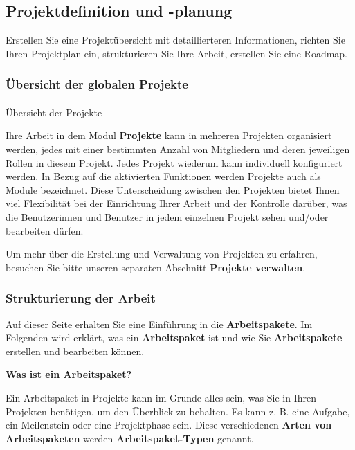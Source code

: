 \documentclass[
  letterpaper,
  DIV=11,
  numbers=noendperiod]{scrreprt}
\makeatletter
\let\oldparagraph\paragraph
\renewcommand{\paragraph}{
    \@ifstar
      \xxxParagraphStar
      \xxxParagraphNoStar
  }
\newcommand{\xxxParagraphStar}[1]{\oldparagraph*{#1}\mbox{}}
\newcommand{\xxxParagraphNoStar}[1]{\oldparagraph{#1}\mbox{}}
\makeatother
\begin{document}
\subsection{Projektdefinition und
-planung}\label{projektdefinition-und--planung}

Erstellen Sie eine Projektübersicht mit detaillierteren Informationen,
richten Sie Ihren Projektplan ein, strukturieren Sie Ihre Arbeit,
erstellen Sie eine Roadmap.

\subsubsection{Übersicht der globalen
Projekte}\label{uxfcbersicht-der-globalen-projekte}

\paragraph{Übersicht der Projekte}\label{uxfcbersicht-der-projekte}

Ihre Arbeit in dem Modul \textbf{Projekte} kann in mehreren Projekten
organisiert werden, jedes mit einer bestimmten Anzahl von Mitgliedern
und deren jeweiligen Rollen in diesem Projekt. Jedes Projekt wiederum
kann individuell konfiguriert werden. In Bezug auf die aktivierten
Funktionen werden Projekte auch als Module bezeichnet. Diese
Unterscheidung zwischen den Projekten bietet Ihnen viel Flexibilität bei
der Einrichtung Ihrer Arbeit und der Kontrolle darüber, was die
Benutzerinnen und Benutzer in jedem einzelnen Projekt sehen und/oder
bearbeiten dürfen.

Um mehr über die Erstellung und Verwaltung von Projekten zu erfahren,
besuchen Sie bitte unseren separaten Abschnitt \textbf{Projekte
verwalten}.

\subsubsection{Strukturierung der
Arbeit}\label{strukturierung-der-arbeit}

Auf dieser Seite erhalten Sie eine Einführung in die
\textbf{Arbeitspakete}. Im Folgenden wird erklärt, was ein
\textbf{Arbeitspaket} ist und wie Sie \textbf{Arbeitspakete} erstellen
und bearbeiten können.

\textbf{Was ist ein Arbeitspaket?}

Ein Arbeitspaket in Projekte kann im Grunde alles sein, was Sie in Ihren
Projekten benötigen, um den Überblick zu behalten. Es kann z. B. eine
Aufgabe, ein Meilenstein oder eine Projektphase sein. Diese
verschiedenen \textbf{Arten von Arbeitspaketen} werden
\textbf{Arbeitspaket-Typen} genannt.
\end{document}
